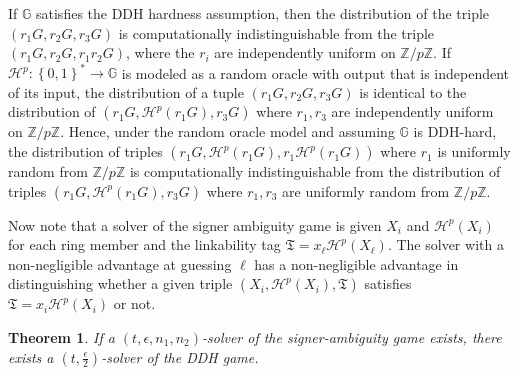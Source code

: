 \documentclass{article}
\theoremstyle{plain}
\newtheorem{theorem}{Theorem}[section]
\theoremstyle{definition}
\begin{document}
If $\mathbb{G}$ satisfies the DDH hardness assumption, then the distribution of the triple $(r_1G, r_2G, r_3G)$ is computationally indistinguishable from the triple $(r_1G, r_2G, r_1r_2G)$,  where the $r_i$ are independently uniform on $\mathbb{Z}/p\mathbb{Z}$. If $\mathcal{H}^p: \left\{0,1\right\}^* \to \mathbb{G}$ is modeled as a random oracle with output that is independent of its input, the distribution of a tuple $(r_1G, r_2G, r_3G)$ is identical to the distribution of $(r_1G, \mathcal{H}^p(r_1G), r_3G)$ where $r_1, r_3$ are independently uniform on $\mathbb{Z}/p\mathbb{Z}$. Hence, under the random oracle model and assuming $\mathbb{G}$ is DDH-hard, the distribution of triples $(r_1G, \mathcal{H}^p(r_1G), r_1\mathcal{H}^p(r_1G))$ where $r_1$ is uniformly random from $\mathbb{Z}/p\mathbb{Z}$ is computationally indistinguishable from the distribution of triples $(r_1G, \mathcal{H}^p(r_1G), r_3G)$ where $r_1, r_3$ are uniformly random from $\mathbb{Z}/p\mathbb{Z}$.
  
  

Now note that a solver of the signer ambiguity game is given $X_i$ and $\mathcal{H}^p(X_i)$ for each ring member and the linkability tag $\mathfrak{T} = x_\ell \mathcal{H}^p(X_\ell)$. The solver with a non-negligible advantage at guessing $\ell$ has a non-negligible advantage in distinguishing whether a given triple $(X_i, \mathcal{H}^p(X_i), \mathfrak{T})$ satisfies $\mathfrak{T} = x_i \mathcal{H}^p(X_i)$ or not.

\begin{theorem}
If a $(t, \epsilon, n_1, n_2)$-solver of the signer-ambiguity game exists, there exists a $(t, \frac{\epsilon}{2})$-solver of the DDH game. 
\end{theorem}
\end{document}
